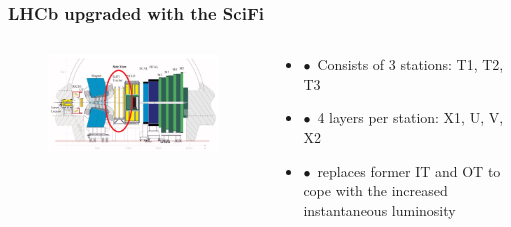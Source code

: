 \documentclass[aspectratio=1610, 12pt, xcolor=dvipsnames]{beamer}
\begin{document}
\begin{frame}\frametitle{LHCb upgraded with the SciFi}
  \begin{columns}
    \begin{column}[c]{0.6\textwidth}
      \begin{figure}
        \includegraphics[width=\textwidth]{logos/upgrade_lhcb.png}
      \end{figure}
    \end{column}
    \begin{column}{0.38\textwidth}
      \begin{itemize}
        \item $\bullet$\, Consists of 3 stations: T1, T2, T3
        \item $\bullet$\, 4 layers per station: X1, U, V, X2
	\item $\bullet$\, replaces former IT and OT to cope with the increased instantaneous luminosity
      \end{itemize}
    \end{column}
  \end{columns}
\end{frame}
\end{document}
